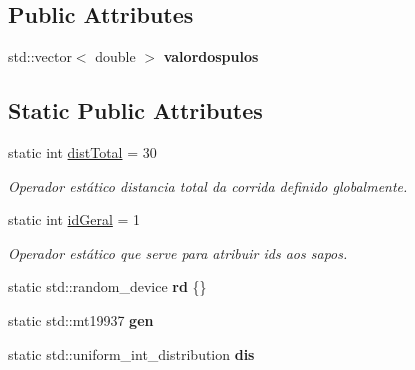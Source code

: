 \subsection*{Public Attributes}
\begin{DoxyCompactItemize}
\item 
std\+::vector$<$ double $>$ {\bfseries valordospulos}\hypertarget{classsapo_a33f0de1c2843b0eae4c0641dac580172}{}\label{classsapo_a33f0de1c2843b0eae4c0641dac580172}

\end{DoxyCompactItemize}
\subsection*{Static Public Attributes}
\begin{DoxyCompactItemize}
\item 
static int \hyperlink{classsapo_a416e95210bbcda29520ba4e52cc1b762}{dist\+Total} = 30\hypertarget{classsapo_a416e95210bbcda29520ba4e52cc1b762}{}\label{classsapo_a416e95210bbcda29520ba4e52cc1b762}

\begin{DoxyCompactList}\small\item\em Operador estático distancia total da corrida definido globalmente. \end{DoxyCompactList}\item 
static int \hyperlink{classsapo_a6d96c6caeb58e7d6bb9db688fb79b3eb}{id\+Geral} = 1\hypertarget{classsapo_a6d96c6caeb58e7d6bb9db688fb79b3eb}{}\label{classsapo_a6d96c6caeb58e7d6bb9db688fb79b3eb}

\begin{DoxyCompactList}\small\item\em Operador estático que serve para atribuir ids aos sapos. \end{DoxyCompactList}\item 
static std\+::random\+\_\+device {\bfseries rd} \{\}\hypertarget{classsapo_ab2379fd784cd63ccd1221620d2d4e620}{}\label{classsapo_ab2379fd784cd63ccd1221620d2d4e620}

\item 
static std\+::mt19937 {\bfseries gen}\hypertarget{classsapo_af852fbc6328761bb46efce21135ae45d}{}\label{classsapo_af852fbc6328761bb46efce21135ae45d}

\item 
static std\+::uniform\+\_\+int\+\_\+distribution {\bfseries dis}\hypertarget{classsapo_ae5fe5f1c0b063994c8a2388c86c89308}{}\label{classsapo_ae5fe5f1c0b063994c8a2388c86c89308}

\end{DoxyCompactItemize}


